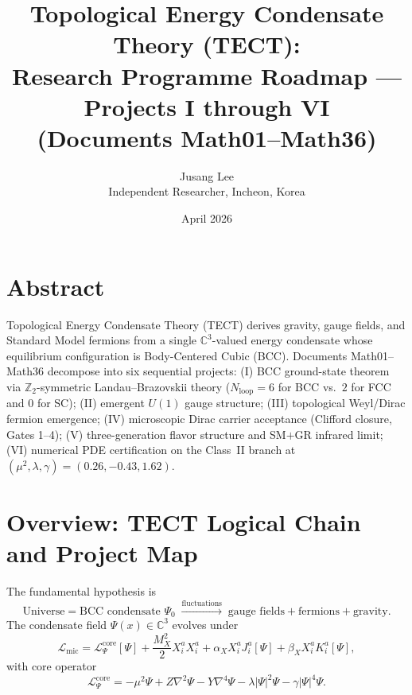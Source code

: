 \documentclass[11pt,a4paper]{article}
\title{Topological Energy Condensate Theory (TECT):\\[4pt]
  \large Research Programme Roadmap --- Projects I through VI\\
  (Documents Math01--Math36)}
\author{Jusang Lee\\
  \small Independent Researcher, Incheon, Korea}
\date{April 2026}
\newcommand{\Nloop}{N_{\mathrm{loop}}}
\begin{document}
\maketitle
\tableofcontents
\newpage

\section*{Abstract}
Topological Energy Condensate Theory (TECT) derives gravity, gauge fields, and Standard
Model fermions from a single $\mathbb{C}^{3}$-valued energy condensate whose equilibrium
configuration is Body-Centered Cubic (BCC).
Documents Math01--Math36 decompose into six sequential projects:
(I) BCC ground-state theorem via $\mathbb{Z}_{2}$-symmetric Landau--Brazovskii theory
($\Nloop=6$ for BCC vs.\ $2$ for FCC and $0$ for SC);
(II) emergent $U(1)$ gauge structure;
(III) topological Weyl/Dirac fermion emergence;
(IV) microscopic Dirac carrier acceptance (Clifford closure, Gates 1--4);
(V) three-generation flavor structure and SM$+$GR infrared limit;
(VI) numerical PDE certification on the Class~II branch at
$(\mu^{2},\lambda,\gamma)=(0.26,-0.43,1.62)$.
\newpage

\section{Overview: TECT Logical Chain and Project Map}

The fundamental hypothesis is
\begin{equation}
\boxed{
  \text{Universe} = \text{BCC condensate } \Psi_{0}
  \;\xrightarrow{\text{fluctuations}}\;
  \text{gauge fields} + \text{fermions} + \text{gravity}.
}
\label{eq:master}
\end{equation}
The condensate field $\Psi(x)\in\mathbb{C}^{3}$ evolves under
\begin{equation}
\mathcal{L}_{\mathrm{mic}}
=\mathcal{L}_{\Psi}^{\mathrm{core}}[\Psi]
+\frac{M_{X}^{2}}{2}X_{i}^{a}X_{i}^{a}
+\alpha_{X}X_{i}^{a}J_{i}^{a}[\Psi]
+\beta_{X}X_{i}^{a}K_{i}^{a}[\Psi],
\label{eq:Lmic}
\end{equation}
with core operator
\begin{equation}
\mathcal{L}_{\Psi}^{\mathrm{core}}
=-\mu^{2}\Psi+Z\nabla^{2}\Psi-Y\nabla^{4}\Psi
-\lambda|\Psi|^{2}\Psi-\gamma|\Psi|^{4}\Psi.
\label{eq:Lcore}
\end{equation}
\end{document}
